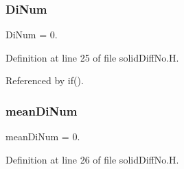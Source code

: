 \subsubsection{\texorpdfstring{Di\+Num}{DiNum}}
{\footnotesize\ttfamily Di\+Num = 0.}



Definition at line 25 of file solid\+Diff\+No.\+H.



Referenced by if().

\mbox{\label{solidDiffNo_8H_a511242fc6a2009262c39ae7fdf45bc93}} 
\subsubsection{\texorpdfstring{mean\+Di\+Num}{meanDiNum}}
{\footnotesize\ttfamily mean\+Di\+Num = 0.}



Definition at line 26 of file solid\+Diff\+No.\+H.

